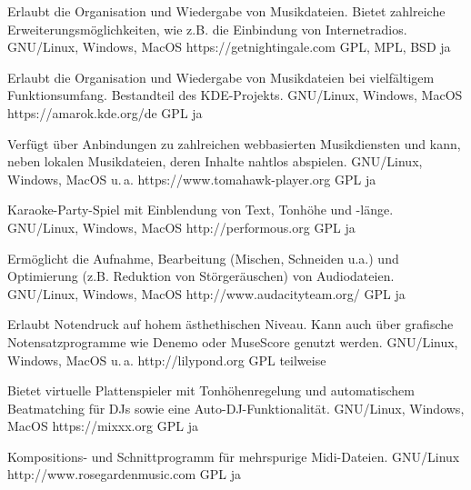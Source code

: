 






{Erlaubt die Organisation und Wiedergabe von Musikdateien. Bietet zahlreiche Erweiterungsmöglichkeiten, wie z.B. die Einbindung von Internetradios.}
{GNU/Linux, Windows, MacOS}
{https://getnightingale.com}
{GPL, MPL, BSD}
{ja}

{Erlaubt die Organisation und Wiedergabe von Musikdateien bei vielfältigem Funktionsumfang. Bestandteil des KDE-Projekts.}
{GNU/Linux, Windows, MacOS}
{https://amarok.kde.org/de}
{GPL}
{ja}

{Verfügt über Anbindungen zu zahlreichen webbasierten Musikdiensten und kann, neben lokalen Musikdateien, deren Inhalte nahtlos abspielen.}
{GNU/Linux, Windows, MacOS u.\,a.}
{https://www.tomahawk-player.org}
{GPL}
{ja}

{Karaoke-Party-Spiel mit Einblendung von Text, Tonhöhe und -länge.}
{GNU/Linux, Windows, MacOS}
{http://performous.org} %
{GPL}
{ja}


{Ermöglicht die Aufnahme, Bearbeitung (Mischen, Schneiden u.a.) und Optimierung (z.B. Reduktion von Störgeräuschen) von Audiodateien.}
{GNU/Linux, Windows, MacOS}
{http://www.audacityteam.org/} %
{GPL}
{ja}

{Erlaubt Notendruck auf hohem ästhethischen Niveau. Kann auch über grafische Notensatzprogramme wie Denemo oder MuseScore genutzt werden.}
{GNU/Linux, Windows, MacOS u.\,a.}
{http://lilypond.org} %
{GPL}
{teilweise}

{Bietet virtuelle Plattenspieler mit Tonhöhenregelung und automatischem Beatmatching für DJs sowie eine Auto-DJ-Funktionalität.}
{GNU/Linux, Windows, MacOS}
{https://mixxx.org}
{GPL}
{ja}

{Kompositions- und Schnittprogramm für mehrspurige Midi-Dateien.}
{GNU/Linux}
{http://www.rosegardenmusic.com} %
{GPL}
{ja}

\backpage


